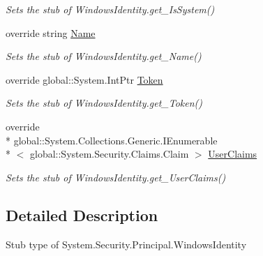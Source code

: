 \begin{DoxyCompactItemize}
\begin{DoxyCompactList}\small\item\em Sets the stub of Windows\-Identity.\-get\-\_\-\-Is\-System()\end{DoxyCompactList}\item 
override string \hyperlink{class_system_1_1_security_1_1_principal_1_1_fakes_1_1_stub_windows_identity_acff234b11508228383ac7f05be1b28c7}{Name}
\begin{DoxyCompactList}\small\item\em Sets the stub of Windows\-Identity.\-get\-\_\-\-Name()\end{DoxyCompactList}\item 
override global\-::\-System.\-Int\-Ptr \hyperlink{class_system_1_1_security_1_1_principal_1_1_fakes_1_1_stub_windows_identity_a35f5d9777529969af12b3e70ec8e2724}{Token}
\begin{DoxyCompactList}\small\item\em Sets the stub of Windows\-Identity.\-get\-\_\-\-Token()\end{DoxyCompactList}\item 
override \\*
global\-::\-System.\-Collections.\-Generic.\-I\-Enumerable\\*
$<$ global\-::\-System.\-Security.\-Claims.\-Claim $>$ \hyperlink{class_system_1_1_security_1_1_principal_1_1_fakes_1_1_stub_windows_identity_a5629a5622902f26ee4a8d835bda1f729}{User\-Claims}
\begin{DoxyCompactList}\small\item\em Sets the stub of Windows\-Identity.\-get\-\_\-\-User\-Claims()\end{DoxyCompactList}\end{DoxyCompactItemize}


\subsection{Detailed Description}
Stub type of System.\-Security.\-Principal.\-Windows\-Identity



